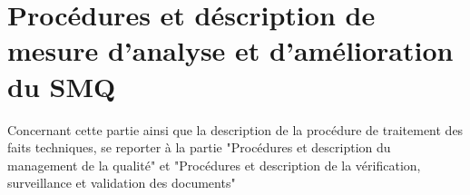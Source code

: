 
\section{Procédures et déscription de mesure d'analyse et d'amélioration du SMQ}\label{qualite}

Concernant cette partie ainsi que la description de la procédure de traitement des faits techniques, se reporter à la partie "Procédures et description du management de la qualité" et "Procédures et description de la vérification, surveillance et validation des documents"
